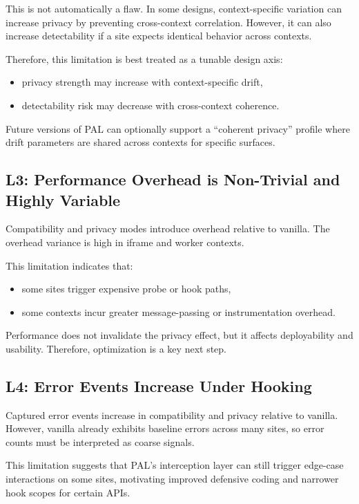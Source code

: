 \documentclass[11pt]{report}
\begin{document}
This is not automatically a flaw. In some designs, context-specific variation can increase privacy by preventing cross-context correlation. However, it can also increase detectability if a site expects identical behavior across contexts.

Therefore, this limitation is best treated as a tunable design axis:
\begin{itemize}
    \item privacy strength may increase with context-specific drift,
    \item detectability risk may decrease with cross-context coherence.
\end{itemize}

Future versions of PAL can optionally support a ``coherent privacy'' profile where drift parameters are shared across contexts for specific surfaces.

\subsection{L3: Performance Overhead is Non-Trivial and Highly Variable}

Compatibility and privacy modes introduce overhead relative to vanilla. The overhead variance is high in iframe and worker contexts.

This limitation indicates that:
\begin{itemize}
    \item some sites trigger expensive probe or hook paths,
    \item some contexts incur greater message-passing or instrumentation overhead.
\end{itemize}

Performance does not invalidate the privacy effect, but it affects deployability and usability. Therefore, optimization is a key next step.

\subsection{L4: Error Events Increase Under Hooking}

Captured error events increase in compatibility and privacy relative to vanilla. However, vanilla already exhibits baseline errors across many sites, so error counts must be interpreted as coarse signals.

This limitation suggests that PAL’s interception layer can still trigger edge-case interactions on some sites, motivating improved defensive coding and narrower hook scopes for certain APIs.
\end{document}
